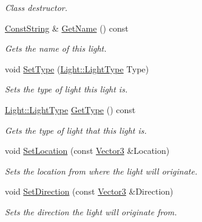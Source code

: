 \begin{DoxyCompactItemize}
\begin{DoxyCompactList}\small\item\em Class destructor. \item\end{DoxyCompactList}\item 
\hyperlink{namespacephys_a5ce5049f8b4bf88d6413c47b504ebb31}{ConstString} \& \hyperlink{classphys_1_1Light_a5e85ef1867ad92d589b6cfa96500fcb2}{GetName} () const 
\begin{DoxyCompactList}\small\item\em Gets the name of this light. \item\end{DoxyCompactList}\item 
void \hyperlink{classphys_1_1Light_a87fced0afb0fd44d333c499d41e8568a}{SetType} (\hyperlink{classphys_1_1Light_aef1be63d57f59f33bf4c66be797009bf}{Light::LightType} Type)
\begin{DoxyCompactList}\small\item\em Sets the type of light this light is. \item\end{DoxyCompactList}\item 
\hyperlink{classphys_1_1Light_aef1be63d57f59f33bf4c66be797009bf}{Light::LightType} \hyperlink{classphys_1_1Light_ac404a6c7df9758f8420a8931118f516b}{GetType} () const 
\begin{DoxyCompactList}\small\item\em Gets the type of light that this light is. \item\end{DoxyCompactList}\item 
void \hyperlink{classphys_1_1Light_adf0d72c9ad1b0cff94bd7f4cba987750}{SetLocation} (const \hyperlink{classphys_1_1Vector3}{Vector3} \&Location)
\begin{DoxyCompactList}\small\item\em Sets the location from where the light will originate. \item\end{DoxyCompactList}\item 
void \hyperlink{classphys_1_1Light_a400a73e51a5aa50aadc43bdd2040ac71}{SetDirection} (const \hyperlink{classphys_1_1Vector3}{Vector3} \&Direction)
\begin{DoxyCompactList}\small\item\em Sets the direction the light will originate from. \item\end{DoxyCompactList}\item 

\end{DoxyCompactItemize}
